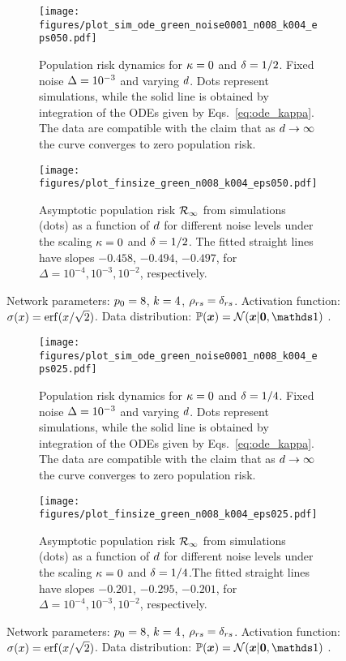 \documentclass[10pt]{article}
\begin{document}
\begin{figure*}[tb!]
\centering
\begin{subfigure}[h]{.45\textwidth}
  \centering
  \texttt{[image: figures/plot\_sim\_ode\_green\_noise0001\_n008\_k004\_eps050.pdf]}
  \vskip -0.05in
  \caption{Population risk dynamics for $\kappa=0$ and $\delta=1/2$. Fixed noise $\Delta = 10^{-3}$ and varying $d$. Dots represent simulations, while the solid line is obtained by integration of the ODEs given by Eqs.~\eqref{eq:ode_kappa}. The data are compatible with the claim that as $d \to \infty$ the curve converges to zero population risk.}
  \label{fig:d32_vary_d}
\end{subfigure}%
\hspace{0.5cm}
\begin{subfigure}[h]{.45\textwidth}
  \centering
  \texttt{[image: figures/plot\_finsize\_green\_n008\_k004\_eps050.pdf]}
  \vskip -0.05in
  \caption{Asymptotic population risk ${\cal R}_\infty$ from simulations (dots) as a function of $d$ for different noise levels under the scaling $\kappa=0$ and $\delta=1/2$. The fitted straight lines have slopes $-0.458$, $-0.494$,  $-0.497$, for $\Delta = 10^{-4} , 10^{-3} , 10^{-2}$, respectively.}
  \label{fig:d32_finite_size}
\end{subfigure}
\vskip -0.05in
\caption{Network parameters:  $p_0 =8$, $k=4$, $\rho_{rs} = \delta_{rs}$. Activation function: $\act(x) = \erf(x/\sqrt{2})$. Data distribution: $\Prob (\x) =  \gauss(\x | \bm{0}, \Id )$ .}
\label{fig:deps_scal_eps050}
\end{figure*}

\begin{figure*}[tb!]
\centering
\begin{subfigure}[h]{.45\textwidth}
  \centering
  \texttt{[image: figures/plot\_sim\_ode\_green\_noise0001\_n008\_k004\_eps025.pdf]}
  \vskip -0.05in
  \caption{Population risk dynamics for $\kappa=0$ and $\delta=1/4$. Fixed noise $\Delta = 10^{-3}$ and varying $d$. Dots represent simulations, while the solid line is obtained by integration of the ODEs given by Eqs.~\eqref{eq:ode_kappa}. The data are compatible with the claim that as $d \to \infty$ the curve converges to zero population risk.}
  \label{fig:d32_vary_d_eps025}
\end{subfigure}%
\hspace{0.5cm}
\begin{subfigure}[h]{.45\textwidth}
  \centering
  \texttt{[image: figures/plot\_finsize\_green\_n008\_k004\_eps025.pdf]}
  \vskip -0.05in
  \caption{Asymptotic population risk ${\cal R}_\infty$ from simulations (dots) as a function of $d$ for different noise levels under the scaling $\kappa=0$ and $\delta=1/4$.The fitted straight lines have slopes $-0.201$, $-0.295$,  $-0.201$, for $\Delta = 10^{-4} , 10^{-3} , 10^{-2}$, respectively.}
 \label{fig:d32_finite_size_eps025}
\end{subfigure}
\vskip -0.05in
\caption{Network parameters: $p_0 =8$, $k=4$, $\rho_{rs} = \delta_{rs}$. Activation function: $\act(x) = \erf(x/\sqrt{2})$. Data distribution: $\Prob (\x) =  \gauss(\x | \bm{0}, \Id )$ .}
\label{fig:deps_scal_eps025}
\end{figure*}
\end{document}
